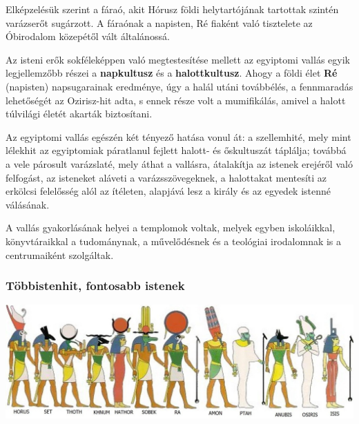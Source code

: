 Elképzelésük szerint a fáraó, akit Hórusz földi helytartójának tartottak szintén varázserőt sugárzott. A fáraónak a napisten, Ré fiaként való tisztelete az Óbirodalom közepétől vált általánossá.

Az isteni erők sokféleképpen való megtestesítése mellett az egyiptomi vallás egyik legjellemzőbb részei a \textbf{napkultusz} és a \textbf{halottkultusz}. Ahogy a földi élet \textbf{Ré} (napisten) napsugarainak eredménye, úgy a halál utáni továbbélés, a fennmaradás lehetőségét az Ozirisz-hit adta, s ennek része volt a mumifikálás, amivel a halott túlvilági életét akarták biztosítani.

Az egyiptomi vallás egészén két tényező hatása vonul át: a szellemhité, mely mint lélekhit az egyiptomiak páratlanul fejlett halott- és őskultuszát táplálja; továbbá a vele párosult varázslaté, mely áthat a vallásra, átalakítja az istenek erejéről való felfogást, az isteneket aláveti a varázsszövegeknek, a halottakat mentesíti az erkölcsi felelősség alól az ítéleten, alapjává lesz a király és az egyedek istenné válásának.

A vallás gyakorlásának helyei a templomok voltak, melyek egyben iskoláikkal, könyvtáraikkal a tudománynak, a művelődésnek és a teológiai irodalomnak is a centrumaiként szolgáltak.

\subsubsection*{Többistenhit, fontosabb istenek}

\begin{tcolorbox}[enhanced,colframe=gray!50!white,
	colbacktitle=gray!15!white,
	coltitle=gray!50!black,
	borderline={0.5mm}{0mm}{gray!15!white},
	borderline={0.5mm}{0mm}{gray!50!white,dashed},
	attach boxed title to top center={yshift=-2mm},
	boxed title style={boxrule=0.4pt},
	title=Az ókori Egyiptom istenei]{
		\includegraphics[width=1.0\linewidth]{images/01/istenek}}
\end{tcolorbox}

